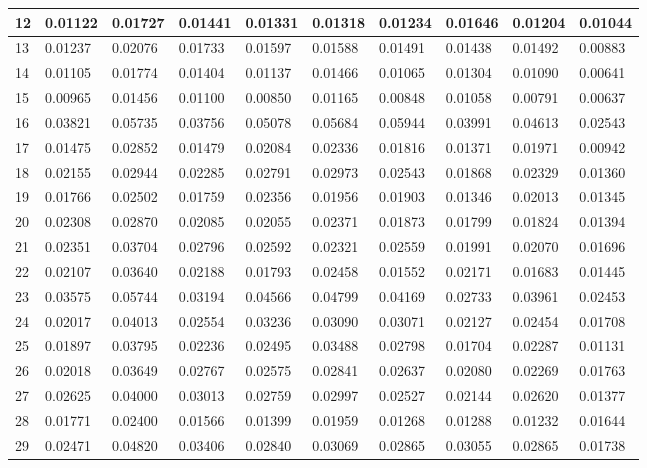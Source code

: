\begin{table}[H]
{\begin{tabular}{|l|l|l|l|l|l|l|l|l|l|}
        12 & 0.01122 & 0.01727 & 0.01441 & 0.01331 & 0.01318 & 0.01234 & 0.01646 & 0.01204 & 0.01044 \\ \hline
        13 & 0.01237 & 0.02076 & 0.01733 & 0.01597 & 0.01588 & 0.01491 & 0.01438 & 0.01492 & 0.00883 \\ \hline
        14 & 0.01105 & 0.01774 & 0.01404 & 0.01137 & 0.01466 & 0.01065 & 0.01304 & 0.01090 & 0.00641 \\ \hline
        15 & 0.00965 & 0.01456 & 0.01100 & 0.00850 & 0.01165 & 0.00848 & 0.01058 & 0.00791 & 0.00637 \\ \hline
        16 & 0.03821 & 0.05735 & 0.03756 & 0.05078 & 0.05684 & 0.05944 & 0.03991 & 0.04613 & 0.02543 \\ \hline
        17 & 0.01475 & 0.02852 & 0.01479 & 0.02084 & 0.02336 & 0.01816 & 0.01371 & 0.01971 & 0.00942 \\ \hline
        18 & 0.02155 & 0.02944 & 0.02285 & 0.02791 & 0.02973 & 0.02543 & 0.01868 & 0.02329 & 0.01360 \\ \hline
        19 & 0.01766 & 0.02502 & 0.01759 & 0.02356 & 0.01956 & 0.01903 & 0.01346 & 0.02013 & 0.01345 \\ \hline
        20 & 0.02308 & 0.02870 & 0.02085 & 0.02055 & 0.02371 & 0.01873 & 0.01799 & 0.01824 & 0.01394 \\ \hline
        21 & 0.02351 & 0.03704 & 0.02796 & 0.02592 & 0.02321 & 0.02559 & 0.01991 & 0.02070 & 0.01696 \\ \hline
        22 & 0.02107 & 0.03640 & 0.02188 & 0.01793 & 0.02458 & 0.01552 & 0.02171 & 0.01683 & 0.01445 \\ \hline
        23 & 0.03575 & 0.05744 & 0.03194 & 0.04566 & 0.04799 & 0.04169 & 0.02733 & 0.03961 & 0.02453 \\ \hline
        24 & 0.02017 & 0.04013 & 0.02554 & 0.03236 & 0.03090 & 0.03071 & 0.02127 & 0.02454 & 0.01708 \\ \hline
        25 & 0.01897 & 0.03795 & 0.02236 & 0.02495 & 0.03488 & 0.02798 & 0.01704 & 0.02287 & 0.01131 \\ \hline
        26 & 0.02018 & 0.03649 & 0.02767 & 0.02575 & 0.02841 & 0.02637 & 0.02080 & 0.02269 & 0.01763 \\ \hline
        27 & 0.02625 & 0.04000 & 0.03013 & 0.02759 & 0.02997 & 0.02527 & 0.02144 & 0.02620 & 0.01377 \\ \hline
        28 & 0.01771 & 0.02400 & 0.01566 & 0.01399 & 0.01959 & 0.01268 & 0.01288 & 0.01232 & 0.01644 \\ \hline
        29 & 0.02471 & 0.04820 & 0.03406 & 0.02840 & 0.03069 & 0.02865 & 0.03055 & 0.02865 & 0.01738 \\ \hline

\end{tabular}}
\end{table}
